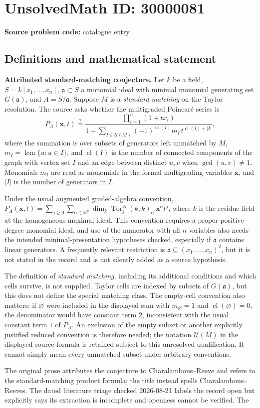 \documentclass[11pt]{article}
\newcommand{\N}{\mathbb{N}}
\begin{document}
\section*{UnsolvedMath ID: 30000081}
\textbf{Source problem code:} catalogue entry
\subsection{Definitions and mathematical statement}
\textbf{Attributed standard-matching conjecture.} Let \(k\) be a field, \(S=k[x_1,\ldots,x_n]\), \(\mathfrak a\subset S\) a monomial ideal with minimal monomial generating set \(G(\mathfrak a)\), and \(A=S/\mathfrak a\). Suppose \(M\) is a \emph{standard matching} on the Taylor resolution. The source asks whether the multigraded Poincar\'e series is\[P_A(\mathbf x,t)\stackrel{?}{=}\frac{\prod_{i=1}^n(1+tx_i)}{1+\sum_{I\in\mathcal U(M)}(-1)^{\operatorname{cl}(I)}m_I\,t^{\operatorname{cl}(I)+|I|}},\] where the summation is over subsets of generators left unmatched by \(M\), \(m_I=\operatorname{lcm}\{u:u\in I\}\), and \(\operatorname{cl}(I)\) is the number of connected components of the graph with vertex set \(I\) and an edge between distinct \(u,v\) when \(\gcd(u,v)\ne1\). Monomials \(m_I\) are read as monomials in the formal multigrading variables \(\mathbf x\), and \(|I|\) is the number of generators in \(I\).\par Under the usual augmented graded-algebra convention, \(P_A(\mathbf x,t)=\sum_{j\ge0}\sum_{\alpha\in\N^n}\dim_k\operatorname{Tor}^A_j(k,k)_\alpha\,\mathbf x^\alpha t^j\), where \(k\) is the residue field at the homogeneous maximal ideal. This convention requires a proper positive-degree monomial ideal, and use of the numerator with all \(n\) variables also needs the intended minimal-presentation hypotheses checked, especially if \(\mathfrak a\) contains linear generators. A frequently relevant restriction is \(\mathfrak a\subseteq(x_1,\ldots,x_n)^2\), but it is not stated in the record and is not silently added as a source hypothesis.\par The definition of \emph{standard matching}, including its additional conditions and which cells survive, is not supplied. Taylor cells are indexed by subsets of \(G(\mathfrak a)\), but this does not define the special matching class. The empty-cell convention also matters: if \(\varnothing\) were included in the displayed sum with \(m_\varnothing=1\) and \(\operatorname{cl}(\varnothing)=0\), the denominator would have constant term \(2\), inconsistent with the usual constant term \(1\) of \(P_A\). An exclusion of the empty subset or another explicitly justified reduced convention is therefore needed; the notation \(\mathcal U(M)\) in the displayed source formula is retained subject to this unresolved qualification. It cannot simply mean every unmatched subset under arbitrary conventions.\par The original prose attributes the conjecture to Charalambous--Reeve and refers to the standard-matching product formula; the title instead spells Charalambous--Reeves. The dated literature triage checked 2026-08-21 labels the record open but explicitly says its extraction is incomplete and openness cannot be verified. The 
\end{document}

